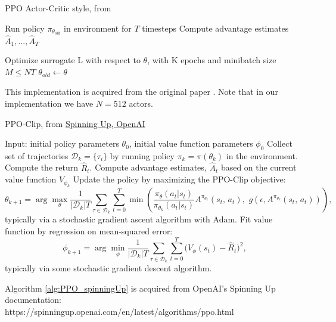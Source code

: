 \begin{algorithm}
\caption{PPO Actor-Critic style, from \cite{PPO}} \label{alg:PPO_actorCriticStyle}
\begin{algorithmic}[1]
        \State Run policy $\pi_{\theta_{old}}$ in environment for $T$ timesteps
        \State Compute advantage estimates $\hat{A}_1 ,..., \hat{A}_T$
    \EndFor
    
    \State Optimize surrogate L with respect to $\theta$, with K epochs and minibatch size $M \leq NT$
    \State $\theta_{old} \leftarrow \theta $
\EndFor
\end{algorithmic}
\end{algorithm}
\noindent
This implementation is acquired from the original paper \cite{PPO}. Note that in our implementation we have $N=512$ actors. \vspace{8mm}

\begin{algorithm}
\caption{PPO-Clip, from \href{https://spinningup.openai.com/en/latest/algorithms/ppo.html}{Spinning Up, OpenAI}} \label{alg:PPO_spinningUp}
\begin{algorithmic}[1]
\State Input: initial policy parameters $\theta_0$, initial value function parameters $\phi_0$
    \State Collect set of trajectories $\mathcal{D}_k = \{\tau_i\}$ by running policy $\pi_k = \pi(\theta_k)$ in the environment.
    \State Compute the return $\hat{R}_t$.
    \State Compute advantage estimates, $\hat{A}_t$ based on the current value function $V_{\phi_k}$
    \State Update the policy by maximizing the PPO-Clip objective:
    \[
    \theta_{k+1} = \arg \max_\theta \frac{1}{|\mathcal{D}_k|T} \sum_{\tau \in \mathcal{D}_k} \sum^{T}_{t=0} \min \left(
    \frac{\pi_\theta (a_t | s_t)}{\pi_{\theta_k} (a_t | s_t)} 
    A^{\pi_{\theta_k}}(s_t, \, a_t), \,\, g(\epsilon, A^{\pi_{\theta_k}}(s_t, \, a_t))
    \right),
    \]
    typically via a stochastic gradient ascent algorithm with Adam.
    \State Fit value function by regression on mean-squared error:
    \[
    \phi_{k+1} = \arg \min_\phi \frac{1}{|\mathcal{D}_k|T} \sum_{\tau \in \mathcal{D}_k} \sum^{T}_{t=0}
    \Big(
    V_\phi (s_t) - \hat{R}_t
    \Big)^2,
    \]
    typically via some stochastic gradient descent algorithm.
\EndFor
\end{algorithmic}
\end{algorithm}

\noindent
Algorithm \ref{alg:PPO_spinningUp} is acquired from OpenAI's Spinning Up documentation:\\
https://spinningup.openai.com/en/latest/algorithms/ppo.html 

